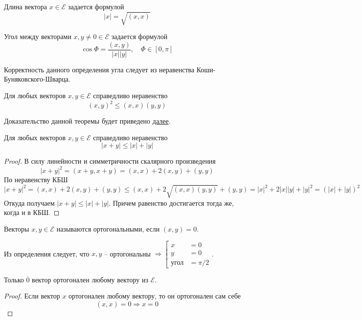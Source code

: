 \begin{definition}
    Длина вектора $x\in \mathcal{E}$ задается формулой $$|x|=\sqrt{(x,x)}$$
\end{definition}
\begin{definition}
    Угол между векторами $x,y\neq 0 \in \mathcal{E}$ задается формулой 
    \[
    \cos \Phi = \frac{(x,y)}{|x||y|}, \quad \Phi \in [0, \pi]
    \]
\end{definition}
Корректность данного определения угла следует из неравенства Коши-Буняковского-Шварца.
\begin{theorem}
    Для любых векторов $x,y\in \mathcal{E}$ справедливо неравенство
    \[
        (x,y)^2\leqslant(x,x)(y,y)
    \]
\end{theorem}
Доказательство данной теоремы будет приведено \hyperref[KBH proof]{далее}.
\begin{theorem}
    Для любых векторов $x,y\in \mathcal{E}$ справедливо неравенство
    \[
    |x+y|\leqslant|x|+|y|
    \]
\end{theorem}
\begin{proof}
    В силу линейности и симметричности скалярного произведения
    \[
    |x+y|^2=(x+y, x+y)=(x,x)+2(x,y)+(y,y)
    \]
    По неравенству КБШ
    \[
    |x+y|^2=(x,x)+2(x,y)+(y,y) \leqslant (x,x)+2\sqrt{(x,x)(y,y)}+(y,y)=|x|^2+2|x||y|+|y|^2=(|x|+|y|)^2
    \]
    Откуда получаем $|x+y|\leqslant|x|+|y|$. Причем равенство достигается тогда же, когда и в КБШ.
\end{proof}
\begin{definition}
    Векторы $x,y \in \mathcal{E}$ называются ортогональными, если $(x,y)=0$.
\end{definition}
Из определения следует, что $x,y$ -- ортогональны $\Rightarrow\left[
\begin{aligned}
x &= 0 \\
y &= 0\\
\text{угол}&=\pi/2
\end{aligned}
\right.$.
\begin{proposition}
    Только $\overline{0}$ вектор ортогонален любому вектору из $\mathcal{E}$.
\end{proposition}
\begin{proof}
    Если вектор $x$ ортогонален любому вектору, то он ортогонален сам себе
    \[
    (x, x)=0 \Rightarrow x=0
    \]
\end{proof}

